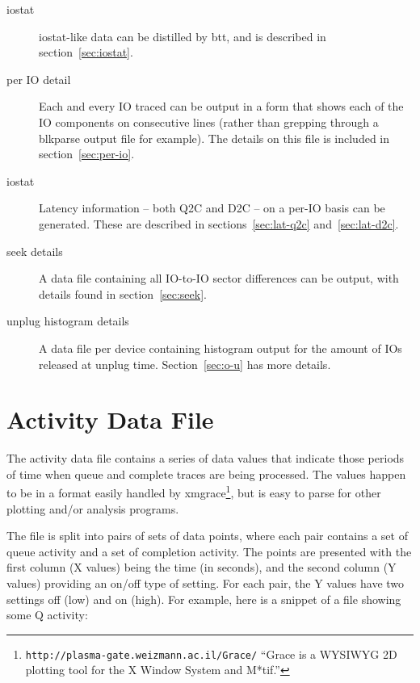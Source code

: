 \documentclass{article}
\begin{document}
  \begin{description}
    \item[iostat] iostat-like data can be distilled by btt, and is
    described in section~\ref{sec:iostat}.

    \item[per IO detail] Each and every IO traced can be output in a form
    that shows each of the IO components on consecutive lines (rather
    than grepping through a blkparse output file for example). The
    details on this file is included in section~\ref{sec:per-io}.

    \item[iostat] Latency information -- both Q2C and D2C --
    on a per-IO basis can be generated. These are described in
    sections~\ref{sec:lat-q2c} and~\ref{sec:lat-d2c}.

    \item[seek details] A data file containing all IO-to-IO
    sector differences can be output, with details found in
    section~\ref{sec:seek}.

    \item[unplug histogram details] A data file per device containing
    histogram output for the amount of IOs released at unplug time.
    Section~\ref{sec:o-u} has more details.
  \end{description}

\newpage\section{\label{sec:activity}Activity Data File}

  The activity data file contains a series of data values that indicate
  those periods of time when queue and complete traces are being
  processed.  The values happen to be in a format easily handled by
  xmgrace\footnote{\texttt{http://plasma-gate.weizmann.ac.il/Grace/}
  ``Grace is a WYSIWYG 2D plotting tool for the X Window System and
  M*tif.''}, but is easy to parse for other plotting and/or analysis
  programs.

  The file is split into pairs of sets of data points, where each pair
  contains a set of queue activity and a set of completion activity. The
  points are presented with the first column (X values) being the time
  (in seconds), and the second column (Y values) providing an on/off
  type of setting. For each pair, the Y values have two settings off
  (low) and on (high). For example, here is a snippet of a file showing
  some Q activity:
\end{document}
